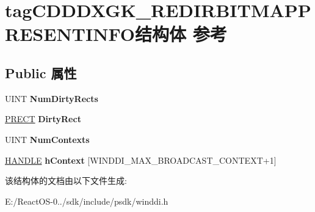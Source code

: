 \hypertarget{structtag_c_d_d_d_x_g_k___r_e_d_i_r_b_i_t_m_a_p_p_r_e_s_e_n_t_i_n_f_o}{}\section{tag\+C\+D\+D\+D\+X\+G\+K\+\_\+\+R\+E\+D\+I\+R\+B\+I\+T\+M\+A\+P\+P\+R\+E\+S\+E\+N\+T\+I\+N\+F\+O结构体 参考}
\label{structtag_c_d_d_d_x_g_k___r_e_d_i_r_b_i_t_m_a_p_p_r_e_s_e_n_t_i_n_f_o}
\subsection*{Public 属性}
\begin{DoxyCompactItemize}
\item 
\mbox{\label{structtag_c_d_d_d_x_g_k___r_e_d_i_r_b_i_t_m_a_p_p_r_e_s_e_n_t_i_n_f_o_a8fd2de925e24b9a31235542eb0f68633}} 
U\+I\+NT {\bfseries Num\+Dirty\+Rects}
\item 
\mbox{\label{structtag_c_d_d_d_x_g_k___r_e_d_i_r_b_i_t_m_a_p_p_r_e_s_e_n_t_i_n_f_o_afd0b2829aac86e5d92ed00695f4efe51}} 
\hyperlink{structtag_r_e_c_t}{P\+R\+E\+CT} {\bfseries Dirty\+Rect}
\item 
\mbox{\label{structtag_c_d_d_d_x_g_k___r_e_d_i_r_b_i_t_m_a_p_p_r_e_s_e_n_t_i_n_f_o_a25c14d9a4473fe6c3e500a0fdd37ba2d}} 
U\+I\+NT {\bfseries Num\+Contexts}
\item 
\mbox{\label{structtag_c_d_d_d_x_g_k___r_e_d_i_r_b_i_t_m_a_p_p_r_e_s_e_n_t_i_n_f_o_add45cde1adcda333664ad268ad3b6409}} 
\hyperlink{interfacevoid}{H\+A\+N\+D\+LE} {\bfseries h\+Context} \mbox{[}W\+I\+N\+D\+D\+I\+\_\+\+M\+A\+X\+\_\+\+B\+R\+O\+A\+D\+C\+A\+S\+T\+\_\+\+C\+O\+N\+T\+E\+XT+1\mbox{]}
\end{DoxyCompactItemize}


该结构体的文档由以下文件生成\+:\begin{DoxyCompactItemize}
\item 
E\+:/\+React\+O\+S-\/0../sdk/include/psdk/winddi.\+h\end{DoxyCompactItemize}
